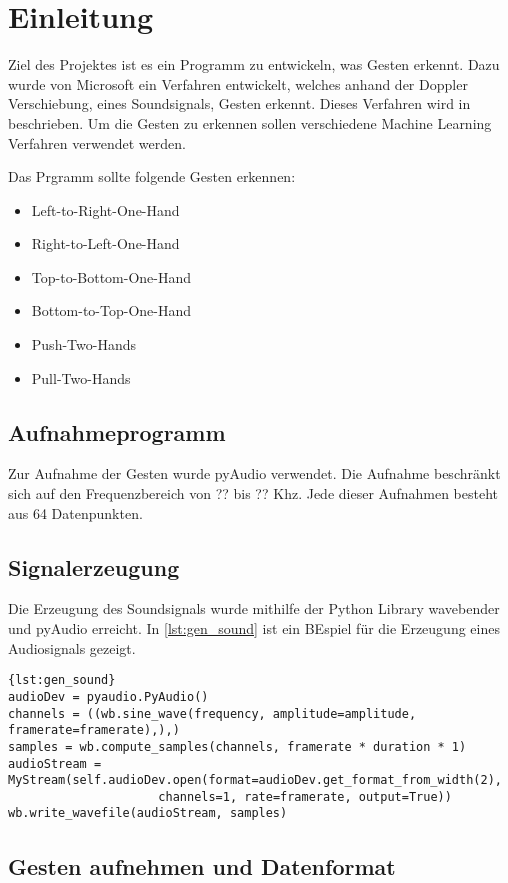\section{Einleitung}
Ziel des Projektes ist es ein Programm zu entwickeln, was Gesten erkennt. Dazu wurde von Microsoft ein Verfahren entwickelt, welches anhand der Doppler Verschiebung, eines Soundsignals, Gesten erkennt. Dieses Verfahren wird in \cite{Gupta2012} beschrieben. Um die Gesten zu erkennen sollen verschiedene Machine Learning Verfahren verwendet werden.

Das Prgramm sollte folgende Gesten erkennen:
\begin{itemize}
	\item Left-to-Right-One-Hand
	\item Right-to-Left-One-Hand
	\item Top-to-Bottom-One-Hand
	\item Bottom-to-Top-One-Hand
	\item Push-Two-Hands
	\item Pull-Two-Hands
\end{itemize}

\subsection{Aufnahmeprogramm}
Zur Aufnahme der Gesten wurde pyAudio verwendet. Die Aufnahme beschränkt sich auf den Frequenzbereich von ?? bis ?? Khz. Jede dieser Aufnahmen besteht aus 64 Datenpunkten. 

\subsection{Signalerzeugung}
Die Erzeugung des Soundsignals wurde mithilfe der Python Library wavebender und pyAudio erreicht. In \autoref{lst:gen_sound} ist ein BEspiel für die Erzeugung eines Audiosignals gezeigt.

\begin{lstlisting}[caption={Erzeugung eines Soundsignals},label={lst:gen_sound}]{lst:gen_sound} 
audioDev = pyaudio.PyAudio()
channels = ((wb.sine_wave(frequency, amplitude=amplitude, framerate=framerate),),)
samples = wb.compute_samples(channels, framerate * duration * 1)
audioStream = MyStream(self.audioDev.open(format=audioDev.get_format_from_width(2),
					 channels=1, rate=framerate, output=True))
wb.write_wavefile(audioStream, samples)
\end{lstlisting}

\subsection{Gesten aufnehmen und Datenformat}
\label{sec:gestures_dataformat}

\nocite{Gupta2012}